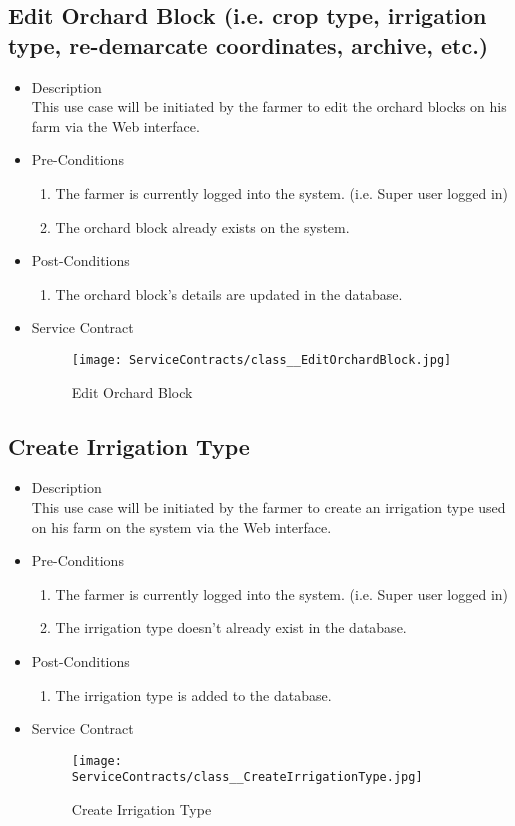 \documentclass[11pt,fleqn]{book} %
\begin{document}
\subsection{Edit Orchard Block (i.e. crop type, irrigation type, re-demarcate coordinates, archive, etc.)}
\begin{itemize}
	\item Description\\
	This use case will be initiated by the farmer to edit the orchard blocks on his farm via the Web interface.
	\item Pre-Conditions
	\begin{enumerate}
		\item The farmer is currently logged into the system. (i.e. Super user logged in)
		\item The orchard block already exists on the system.				
	\end{enumerate}
	\item Post-Conditions
	\begin{enumerate}
		\item The orchard block’s details are updated in the database.
	\end{enumerate}
	\item Service Contract
	\begin{figure}
		\texttt{[image: ServiceContracts/class\_\_EditOrchardBlock.jpg]}
		\caption{Edit Orchard Block}
	\end{figure}
\end{itemize}

\subsection{Create Irrigation Type}
\begin{itemize}
	\item Description\\
	This use case will be initiated by the farmer to create an irrigation type used on his farm on the system via the Web interface.
	\item Pre-Conditions
	\begin{enumerate}
		\item The farmer is currently logged into the system. (i.e. Super user logged in)
		\item The irrigation type doesn’t already exist in the database. 
	\end{enumerate}
	\item Post-Conditions
	\begin{enumerate}
		\item The irrigation type is added to the database.	
	\end{enumerate}
	\item Service Contract
	\begin{figure}
		\texttt{[image: ServiceContracts/class\_\_CreateIrrigationType.jpg]}
		\caption{Create Irrigation Type}
	\end{figure}
\end{itemize}
\end{document}
